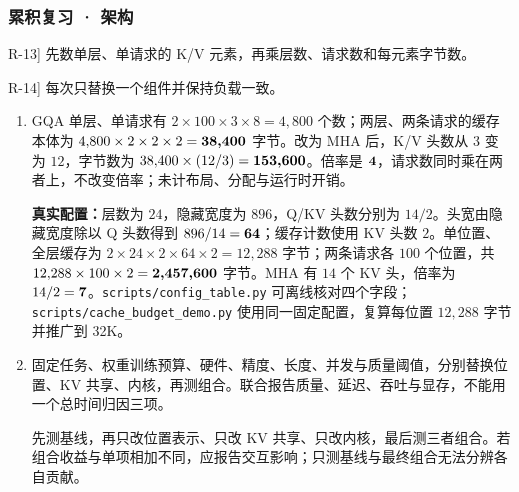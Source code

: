 \subsubsection*{累积复习 · 架构}
\begin{answerhints}
\item[\hyperref[exercise:review-gqa-budget]{R-13}] \leavevmode{}\label{hint:review-gqa-budget}先数单层、单请求的 K/V 元素，再乘层数、请求数和每元素字节数。
\item[\hyperref[exercise:review-architecture-ablation]{R-14}] \leavevmode{}\label{hint:review-architecture-ablation}每次只替换一个组件并保持负载一致。
\end{answerhints}
\begin{enumerate}[label={},leftmargin=4.8em,itemsep=4pt]
\item[\textbf{\hyperref[exercise:review-gqa-budget]{R-13.}}] \leavevmode{}\label{solution:R-13}\label{solution:review-gqa-budget}GQA 单层、单请求有 $2\times100\times3\times8=4{,}800$ 个数；两层、两条请求的缓存本体为 $4{,}800\times2\times2\times2=\boldsymbol{38{,}400}$ 字节。改为 MHA 后，K/V 头数从 $3$ 变为 $12$，字节数为 $38{,}400\times(12/3)=\boldsymbol{153{,}600}$。倍率是 $\boldsymbol{4}$，请求数同时乘在两者上，不改变倍率；未计布局、分配与运行时开销。
\par\textbf{真实配置：}层数为 $24$，隐藏宽度为 $896$，Q/KV 头数分别为 $14/2$。头宽由隐藏宽度除以 Q 头数得到 $896/14=\boldsymbol{64}$；缓存计数使用 KV 头数 $2$。单位置、全层缓存为 $2\times24\times2\times64\times2=12{,}288$ 字节；两条请求各 $100$ 个位置，共 $12{,}288\times100\times2=\boldsymbol{2{,}457{,}600}$ 字节。MHA 有 $14$ 个 KV 头，倍率为 $14/2=\boldsymbol{7}$。\texttt{scripts/config\_table.py} 可离线核对四个字段；\texttt{scripts/cache\_budget\_demo.py} 使用同一固定配置，复算每位置 $12{,}288$ 字节并推广到 32K。
\item[\textbf{\hyperref[exercise:review-architecture-ablation]{R-14.}}] \leavevmode{}\label{solution:R-14}\label{solution:review-architecture-ablation}固定任务、权重训练预算、硬件、精度、长度、并发与质量阈值，分别替换位置、KV 共享、内核，再测组合。联合报告质量、延迟、吞吐与显存，不能用一个总时间归因三项。\par 先测基线，再只改位置表示、只改 KV 共享、只改内核，最后测三者组合。若组合收益与单项相加不同，应报告交互影响；只测基线与最终组合无法分辨各自贡献。
\end{enumerate}
